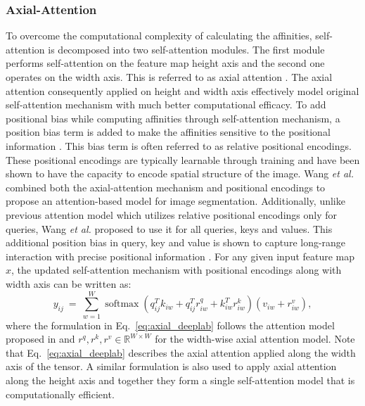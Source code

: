 \documentclass[runningheads]{llncs}
\begin{document}
	\subsubsection{Axial-Attention}
	To overcome the computational complexity of calculating the affinities, self-attention is decomposed into two self-attention modules. The first module performs self-attention on the feature map height axis and the second one operates on the width axis. This is referred to as axial attention \cite{ho2019axial}. The axial attention consequently applied on height and width axis effectively model original self-attention mechanism with much better computational efficacy. To add positional bias while computing affinities through self-attention mechanism, a position bias term is added to make the affinities sensitive to the positional information \cite{shaw2018self}. This bias term is often referred to as relative positional encodings. These positional encodings are typically learnable through training and have been shown to have the capacity to encode spatial structure of the image. Wang \emph{et al.} \cite{wang2020axial} combined both the axial-attention mechanism and positional encodings to propose an attention-based model for image segmentation. Additionally, unlike previous attention model which utilizes relative positional encodings only for queries, Wang \emph{et al.} \cite{wang2020axial} proposed to use it for all queries, keys and values. This additional position bias in query, key and value is shown to capture long-range interaction with precise positional information \cite{wang2020axial}. For any given input feature map $x$, the updated self-attention mechanism with positional encodings along with width axis can be written as:
	\begin{equation}\label{eq:axial_deeplab}
	y_{ij} \ = \ \sum_{w=1}^{W} \operatorname{softmax} \left(q_{ij}^{T} k_{iw} + q_{ij}^{T} r^q_{iw} + k_{iw}^{T} r^k_{iw} \right) (v_{iw} + r^v_{iw}),
	\end{equation}
	where the formulation in Eq.~\ref{eq:axial_deeplab} follows the attention model proposed in \cite{wang2020axial} and $r^q, r^k, r^v \in \mathbb{R}^{W \times W}$ for the width-wise axial attention model. Note that  Eq.~\ref{eq:axial_deeplab} describes the axial attention applied along  the width axis of the tensor.   A similar formulation is also used to apply axial attention along the height axis and together they form a single self-attention model that is computationally efficient.
	
\end{document}
